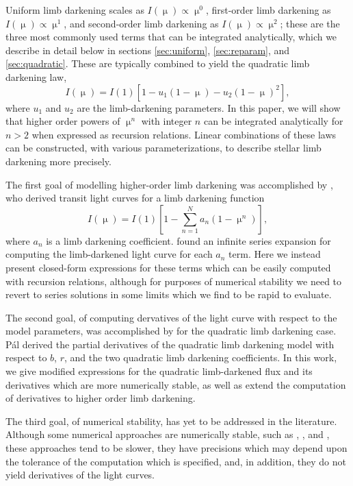 \documentclass[modern]{aastex61}
\begin{document}
Uniform limb darkening scales as $I(\upmu) \propto \upmu^0$, first-order 
limb darkening as $I(\upmu) \propto \upmu^1$, and second-order limb darkening 
as $I(\upmu)\propto \upmu^2$; these are the three most commonly used  terms
that can be integrated analytically, which we describe in detail below 
in sections \ref{sec:uniform}, \ref{sec:reparam}, and \ref{sec:quadratic}.
These are typically combined to yield the quadratic limb darkening law,
\begin{equation} \label{eq:quadraticld}
I(\upmu) = I(1) [1-u_1 (1-\upmu) - u_2 (1-\upmu)^2],
\end{equation}
where $u_1$ and $u_2$ are the limb-darkening parameters.
In this paper, we will show that higher order powers of $\upmu^n$ with integer
$n$ can be integrated analytically for $n > 2$ when expressed as recursion relations.
Linear combinations of these laws can be constructed,
with various parameterizations, to describe stellar limb darkening more precisely.

The first goal of modelling higher-order limb darkening was accomplished
by \citet{Gimenez2006}, who derived transit light curves for a limb darkening
function
\begin{equation} \label{eq:gimenez}
I(\upmu) = I(1) \left[1-\sum_{n=1}^N a_n (1-\upmu^n) \right],
\end{equation}
where $a_n$ is a limb darkening coefficient.  \cite{Gimenez2006}
found an infinite series expansion for computing the limb-darkened light curve
for each $a_n$ term.  Here we instead present closed-form expressions for these terms
which can be easily computed with recursion relations, although for purposes
of numerical stability we need to revert to series solutions in some limits
which we find to be rapid to evaluate.

The second goal, of computing dervatives of the light curve with respect to
the model parameters, was accomplished by \cite{Pal2008} for the quadratic
limb darkening case.  P\'al derived the partial derivatives of the quadratic
limb darkening model with respect to $b$, $r$, and the two quadratic
limb darkening coefficients.  In this work, we give modified expressions
for the quadratic limb-darkened flux and its derivatives which are
more numerically stable, as well as extend the computation of derivatives
to higher order limb darkening.

The third goal, of numerical stability, has yet to be addressed in the literature.
Although some numerical approaches are numerically stable, such as \cite{Gimenez2006},
\cite{Kreidberg2015}, and \cite{Parviainen2015}, these approaches tend to be 
slower, they have precisions which may depend upon the tolerance of the computation
which is specified, and, in addition, they do not yield derivatives of the light curves.
\end{document}
